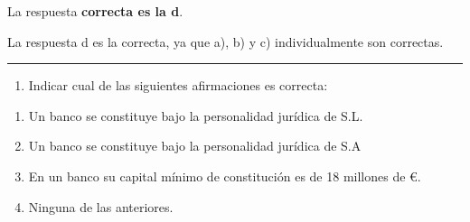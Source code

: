 \documentclass[
  letterpaper,
  DIV=11,
  numbers=noendperiod]{scrreprt}
\providecommand{\tightlist}{%
  \setlength{\itemsep}{0pt}\setlength{\parskip}{0pt}}\usepackage{longtable,booktabs,array}
\begin{document}
\begin{tcolorbox}[enhanced jigsaw, left=2mm, opacityback=0, colback=white, breakable, arc=.35mm, bottomrule=.15mm, rightrule=.15mm, toprule=.15mm, leftrule=.75mm, colframe=quarto-callout-tip-color-frame]
\begin{minipage}[t]{5.5mm}
\textcolor{quarto-callout-tip-color}{\faLightbulb}
\end{minipage}%
\begin{minipage}[t]{\textwidth - 5.5mm}

La respuesta \textbf{correcta es la d}.

La respuesta d es la correcta, ya que a), b) y c) individualmente son
correctas.

\end{minipage}%
\end{tcolorbox}

\begin{center}\rule{0.5\linewidth}{0.5pt}\end{center}

\begin{enumerate}
\def\labelenumi{\arabic{enumi}.}
\setcounter{enumi}{21}
\tightlist
\item
  Indicar cual de las siguientes afirmaciones es correcta:
\end{enumerate}

\begin{enumerate}
\def\labelenumi{\alph{enumi})}
\item
  Un banco se constituye bajo la personalidad jurídica de S.L.
\item
  Un banco se constituye bajo la personalidad jurídica de S.A
\item
  En un banco su capital mínimo de constitución es de 18 millones de €.
\item
  Ninguna de las anteriores.
\end{enumerate}
\end{document}
